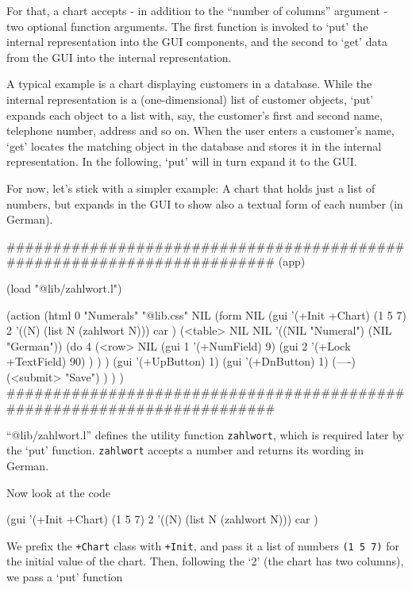 For that, a chart accepts - in addition to the ``number of columns''
argument - two optional function arguments. The first function is
invoked to `put' the internal representation into the GUI components,
and the second to `get' data from the GUI into the internal
representation.

A typical example is a chart displaying customers in a database. While
the internal representation is a (one-dimensional) list of customer
objects, `put' expands each object to a list with, say, the customer's
first and second name, telephone number, address and so on. When the
user enters a customer's name, `get' locates the matching object in the
database and stores it in the internal representation. In the following,
`put' will in turn expand it to the GUI.

For now, let's stick with a simpler example: A chart that holds just a
list of numbers, but expands in the GUI to show also a textual form of
each number (in German).


\begin{wideverbatim}
########################################################################
(app)

(load "@lib/zahlwort.l")

(action
   (html 0 "Numerals" "@lib.css" NIL
      (form NIL
         (gui '(+Init +Chart) (1 5 7) 2
            '((N) (list N (zahlwort N)))
            car )
         (<table> NIL NIL '((NIL "Numeral") (NIL "German"))
            (do 4
               (<row> NIL
                  (gui 1 '(+NumField) 9)
                  (gui 2 '(+Lock +TextField) 90) ) ) )
         (gui '(+UpButton) 1)
         (gui '(+DnButton) 1)
         (----)
         (<submit> "Save") ) ) )
########################################################################
\end{wideverbatim}

``@lib/zahlwort.l'' defines the utility function \texttt{zahlwort}, which is
required later by the `put' function. \texttt{zahlwort} accepts a number and
returns its wording in German.

Now look at the code


\begin{wideverbatim}
(gui '(+Init +Chart) (1 5 7) 2
   '((N) (list N (zahlwort N)))
   car )
\end{wideverbatim}

We prefix the \texttt{+Chart} class with \texttt{+Init}, and pass it a list of numbers
\texttt{(1 5 7)} for the initial value of the chart. Then, following the `2'
(the chart has two columns), we pass a `put' function


